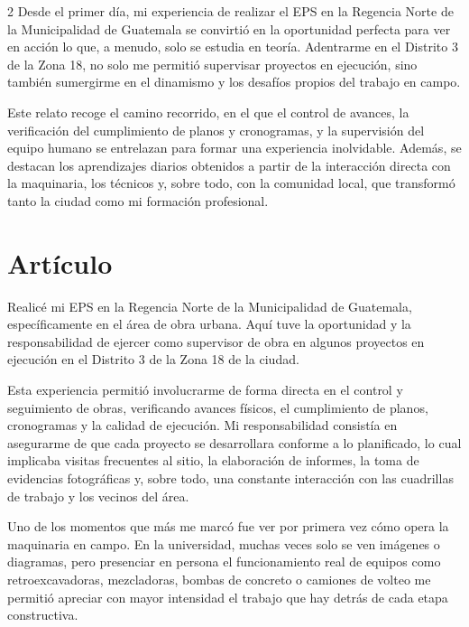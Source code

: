 \documentclass[12pt,spanish,Letterpaper,openany]{book}
\begin{document}
\begin {multicols}{2}
Desde el primer día, mi experiencia de realizar el EPS en la Regencia Norte de la Municipalidad de Guatemala se convirtió en la oportunidad perfecta para ver en acción lo que, a menudo, solo se estudia en teoría. Adentrarme en el Distrito 3 de la Zona 18, no solo me permitió supervisar proyectos en ejecución, sino también sumergirme en el dinamismo y los desafíos propios del trabajo en campo.

Este relato recoge el camino recorrido, en el que el control de avances, la verificación del cumplimiento de planos y cronogramas, y la supervisión del equipo humano se entrelazan para formar una experiencia inolvidable. Además, se destacan los aprendizajes diarios obtenidos a partir de la interacción directa con la maquinaria, los técnicos y, sobre todo, con la comunidad local, que transformó tanto la ciudad como mi formación profesional.

\hypertarget{artuxedculo-2}{%
\section{Artículo}\label{artuxedculo-2}}

Realicé mi EPS en la Regencia Norte de la Municipalidad de Guatemala, específicamente en el área de obra urbana. Aquí tuve la oportunidad y la responsabilidad de ejercer como supervisor de obra en algunos proyectos en ejecución en el Distrito 3 de la Zona 18 de la ciudad.

Esta experiencia permitió involucrarme de forma directa en el control y seguimiento de obras, verificando avances físicos, el cumplimiento de planos, cronogramas y la calidad de ejecución. Mi responsabilidad consistía en asegurarme de que cada proyecto se desarrollara conforme a lo planificado, lo cual implicaba visitas frecuentes al sitio, la elaboración de informes, la toma de evidencias fotográficas y, sobre todo, una constante interacción con las cuadrillas de trabajo y los vecinos del área.

Uno de los momentos que más me marcó fue ver por primera vez cómo opera la maquinaria en campo. En la universidad, muchas veces solo se ven imágenes o diagramas, pero presenciar en persona el funcionamiento real de equipos como retroexcavadoras, mezcladoras, bombas de concreto o camiones de volteo me permitió apreciar con mayor intensidad el trabajo que hay detrás de cada etapa constructiva.

\bigskip
\bigskip


\end{multicols}
\end{document}
